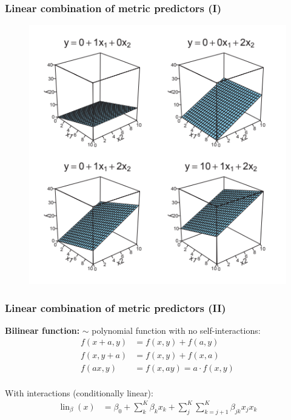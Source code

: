\documentclass[usenames,dvipsnames,table]{beamer}
\begin{document}
\begin{frame}
\frametitle{Linear combination of metric predictors (I)}
\begin{figure}
\centering
\includegraphics[height=.8\textheight]{img/fig15_2}
\end{figure}
\end{frame}

\begin{frame}
\frametitle{Linear combination of metric predictors (II)}

\textbf{Bilinear function:} $\sim$ polynomial function with no self-interactions:
\begin{align*}
    f(x + a, y) &= f(x, y) + f(a, y) \\
    f(x, y + a) &= f(x, y) + f(x, a) \\
    f(ax, y) &= f(x, ay) = a\cdot f(x, y)\\
\end{align*}

With interactions (conditionally linear):
\begin{align*}
\operatorname{lin}_{\beta}(x) &= \beta_0 + \sum_k^K \beta_k x_k + \sum_j^K \sum_{k=j+1}^K \beta_{jk} x_j x_k \\
\end{align*}

\end{frame}
\end{document}
